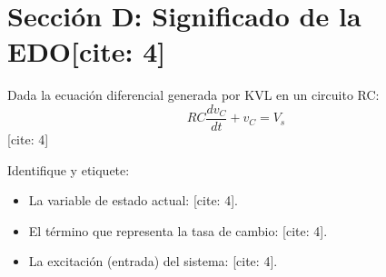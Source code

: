 \documentclass[11pt, a4paper]{article}
\begin{document}
\section*{Sección D: Significado de la EDO[cite: 4]}
Dada la ecuación diferencial generada por KVL en un circuito RC:
$$RC \frac{dv_C}{dt} + v_C = V_s$$[cite: 4]

Identifique y etiquete:
\begin{itemize}
    \item La variable de estado actual: \underline{\hspace{4cm}}[cite: 4].
    \item El término que representa la tasa de cambio: \underline{\hspace{4cm}}[cite: 4].
    \item La excitación (entrada) del sistema: \underline{\hspace{4cm}}[cite: 4].
\end{itemize}
\end{document}
